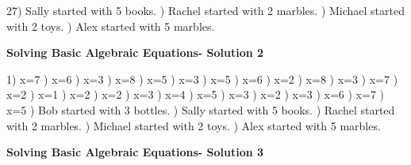 \documentclass{article}%
\begin{document}
27) Sally started with 5 books.%
) Rachel started with 2 marbles.%
) Michael started with 2 toys.%
) Alex started with 5 marbles.%
\newline%
\newpage%
\large%
\begin{center}%
\textbf{Solving Basic Algebraic Equations- Solution 2}%
\newline%
\end{center} \normalsize%
1) x=7%
) x=6%
) x=3%
) x=8%
) x=5%
) x=3%
) x=5%
) x=6%
) x=2%
) x=8%
) x=3%
) x=7%
) x=2%
) x=1%
) x=2%
) x=2%
) x=3%
) x=4%
) x=5%
) x=3%
) x=2%
) x=3%
) x=6%
) x=7%
) x=5%
) Bob started with 3 bottles.%
) Sally started with 5 books.%
) Rachel started with 2 marbles.%
) Michael started with 2 toys.%
) Alex started with 5 marbles.%
\newline%
\newpage%
\large%
\begin{center}%
\textbf{Solving Basic Algebraic Equations- Solution 3}%
\newline%
\end{center} \normalsize%
\end{document}
